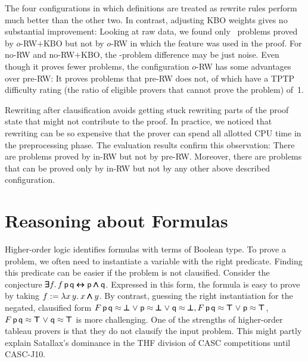 \documentclass[smallcondensed,draft]{svjour3}     %
\begin{document}
The four configurations in which definitions are treated as rewrite rules
perform much better than the other two. In contrast, adjusting KBO weights gives
no substantial improvement: Looking at raw data, we found only
~problems proved by $o$-RW$+$KBO but not by $o$-RW in which the
feature was used in the proof. For no-RW and no-RW$+$KBO, the
-problem difference may be just noise. Even though it proves fewer
problems, the configuration $o$-RW has some advantages over pre-RW: It proves
 problems that pre-RW does not,  of which have a TPTP
difficulty rating (the ratio of eligible %
provers that cannot prove the problem) of~1.

Rewriting after clausification avoids getting stuck rewriting parts of the
proof state that might not contribute to the proof. In practice, we noticed that
rewriting can be so expensive that the prover can spend all
allotted CPU time in the preprocessing phase. The evaluation results confirm this
observation: There are  problems proved by in-RW but not by
pre-RW. Moreover, there are  problems that can be proved only
by in-RW but not by any other above described configuration. %

\section{Reasoning about Formulas}
\label{sec:ho-tech:formulas}

Higher-order logic identifies formulas with terms of Boolean type. To prove a problem, we often
need to instantiate a variable with the right predicate.
Finding this predicate can be easier if the problem is not clausified.
Consider the conjecture $\pmb\exists f. \, f \, \mathsf{p} \, \mathsf{q} \pmb\leftrightarrow \mathsf{p}
\pmb\land \mathsf{q}$. Expressed in this form, the formula is easy to prove by taking
$f := \lambda x \, y. \> x  \pmb\land y$. By contrast, guessing the right
instantiation for the negated, clausified form $ F \, \mathsf{p} \,
\mathsf{q} \approx \pmb\bot \mathrel\lor \mathsf{p} \approx \pmb\bot \mathrel\lor \mathsf{q} \approx \pmb\bot,
F \, \mathsf{p} \, \mathsf{q} \approx \pmb\top \mathrel\lor \mathsf{p} \approx \pmb\top$, $F \, \mathsf{p}
\, \mathsf{q} \approx \pmb\top \mathrel\lor \mathsf{q} \approx \pmb\top$ is more challenging.
One of the strengths of higher-order tableau provers is that they do not clausify the input
problem. This might partly explain Satallax's dominance in the THF division of CASC
competitions until CASC-J10.
\end{document}
